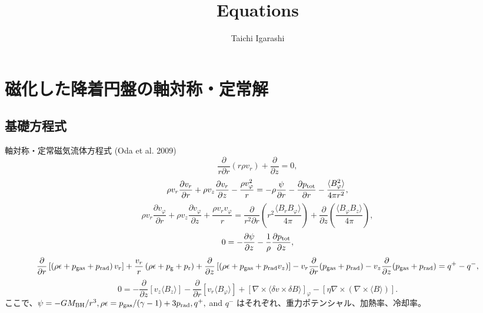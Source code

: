 \documentclass[11pt, oneside]{article}   	%
\title{Equations}
\author{Taichi Igarashi}
\begin{document}
\maketitle
\section{磁化した降着円盤の軸対称・定常解}
\subsection{基礎方程式}
軸対称・定常磁気流体方程式 (Oda et al. 2009)
\begin{equation}
	\frac{\partial}{r\partial r}\left( r\rho v_r \right) + \frac{\partial}{\partial z} = 0,
\end{equation}
\begin{equation}
	\rho v_r\frac{\partial v_r}{\partial r} + \rho v_z\frac{\partial v_r}{\partial z} - \frac{\rho v_\varphi^2}{r} = -\rho\frac{\psi}{\partial r} - \frac{\partial p_{\rm tot}}{\partial r} - \frac{\langle B_\varphi^2 \rangle}{4\pi r^2},
\end{equation}
\begin{equation}
	\rho v_r\frac{\partial v_\varphi}{\partial r} + \rho v_z\frac{\partial v_\varphi}{\partial z} + \frac{\rho v_rv_\varphi}{r} = \frac{\partial}{r^2\partial r}\left( r^2\frac{\langle B_rB_\varphi \rangle}{4\pi} \right) + \frac{\partial}{\partial z}\left( \frac{\langle B_\varphi B_z \rangle}{4\pi}\right),
\end{equation}
\begin{equation}
	0 = -\frac{\partial \psi}{\partial z} - \frac{1}{\rho}\frac{\partial p_{\rm tot}}{\partial z},
\end{equation}
\begin{equation}
	\frac{\partial}{\partial r}\left[\left( \rho\epsilon + p_{\rm gas} + p_{\rm rad} \right)v_r\right] + \frac{v_r}{r}\left( \rho\epsilon + p_{\rm g} + p_{\rm r} \right) + \frac{\partial}{\partial z}\left[\left( \rho\epsilon + p_{\rm gas} + p_{\rm rad}v_z \right)\right] - v_r\frac{\partial}{\partial r}(p_{\rm gas}+p_{\rm rad}) - v_z\frac{\partial}{\partial z}(p_{\rm gas}+p_{\rm rad}) = q^+ - q^-,
\end{equation}
\begin{equation}
	0 = -\frac{\partial}{\partial z}\left[ v_z\langle B_z \rangle \right] - \frac{\partial}{\partial r}\left[ v_r \langle B_\varphi \rangle\right] + \left[ \nabla\times \langle \delta{v} \times \delta{B} \rangle\right]_\varphi - \left[ \eta\nabla\times\left( \nabla\times\langle{B}\rangle \right)\right].
\end{equation}
ここで、$\psi=-GM_{\rm BH}/r^3, \rho\epsilon=p_{\rm gas}/(\gamma-1) + 3p_{\rm rad}, q^+,$ and $q^-$ はそれぞれ、重力ポテンシャル、加熱率、冷却率。
\end{document}
